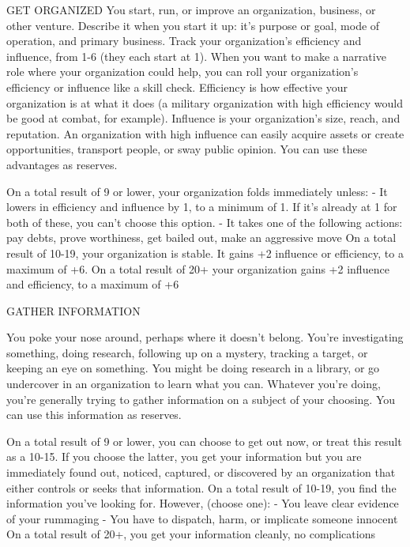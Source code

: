 GET ORGANIZED  
You start, run, or improve an organization, business, or other venture. Describe it when you start it  
up: it’s purpose or goal, mode of operation, and primary business. Track your organization’s  
efficiency and influence, from 1-6 (they each start at 1). When you want to make a narrative role  
where your organization could help, you can roll your organization’s efficiency or influence like a  
skill check. Efficiency is how effective your organization is at what it does (a military organization  
with high efficiency would be good at combat, for example). Influence is your organization’s size,  
reach, and reputation. An organization with high influence can easily acquire assets or create  
opportunities, transport people, or sway public opinion. You can use these advantages as  
reserves.  

On a total result of 9 or lower, your organization folds immediately unless:  
    -    It lowers in efficiency and influence by 1, to a minimum of 1. If it’s already at 1 for both of  
         these, you can’t choose this option.  
    -    It takes one of the following actions: pay debts, prove worthiness, get bailed out, make an  
         aggressive move  
On a total result of 10-19, your organization is stable. It gains +2 influence or efficiency, to a  
maximum of +6.  
On a total result of 20+ your organization gains +2 influence and efficiency, to a maximum of +6  

GATHER INFORMATION  

                                                                                                                   


You poke your nose around, perhaps where it doesn’t belong. You’re investigating something,  
doing research, following up on a mystery, tracking a target, or keeping an eye on something. You  
might be doing research in a library, or go undercover in an organization to learn what you can.  
Whatever you’re doing, you’re generally trying to gather information on a subject of your choosing.  
You can use this information as reserves.  

On a total result of 9 or lower, you can choose to get out now, or treat this result as a 10-15. If you  
choose the latter, you get your information but you are immediately found out, noticed, captured,  
or discovered by an organization that either controls or seeks that information.  
On a total result of 10-19, you find the information you’ve looking for. However, (choose one):  
    -    You leave clear evidence of your rummaging  
    -    You have to dispatch, harm, or implicate someone innocent  
On a total result of 20+, you get your information cleanly, no complications  

